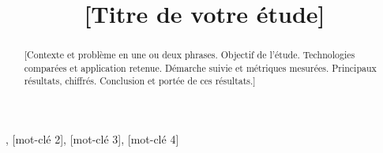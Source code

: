 \documentclass[conference,a4paper]{IEEEtran}
\begin{document}
\title{[Titre de votre étude]}

\author{
\and
{}
\and
{}
\and
{}
\and
{}
\and
{}
}

\maketitle

\begin{abstract}
[Contexte et problème en une ou deux phrases. Objectif de l'étude.
Technologies comparées et application retenue. Démarche suivie et
métriques mesurées. Principaux résultats, chiffrés. Conclusion et portée
de ces résultats.]
\end{abstract}

\begin{IEEEkeywords}
, [mot-clé 2], [mot-clé 3], [mot-clé 4]
\end{IEEEkeywords}
\end{document}
